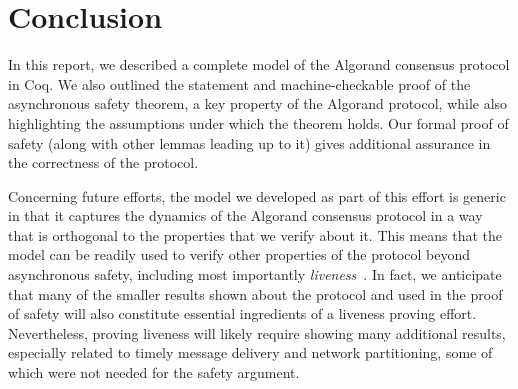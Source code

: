 \section{Conclusion}
\label{sec:conclusion}

In this report, we described a complete model of the Algorand consensus protocol in Coq. We also outlined the statement and machine-checkable proof of the asynchronous safety theorem, a key property of the Algorand protocol, while also highlighting the assumptions under which the theorem holds. Our formal proof of safety (along with other lemmas leading up to it) gives additional assurance in the correctness of the protocol.

Concerning future efforts, the model we developed as part of this effort is generic in that it captures the dynamics of the Algorand consensus protocol in a way that is orthogonal to the properties that we verify about it. This means that the model can be readily used to verify other properties of the protocol beyond asynchronous safety, including most importantly \emph{liveness}~\cite{Chen2019}. In fact, we anticipate that many of the smaller results shown about the protocol and used in the proof of safety will also constitute essential ingredients of a liveness proving effort. Nevertheless, proving liveness will likely require showing many additional results, especially related to timely message delivery and network partitioning, some of which were not needed for the safety argument.
